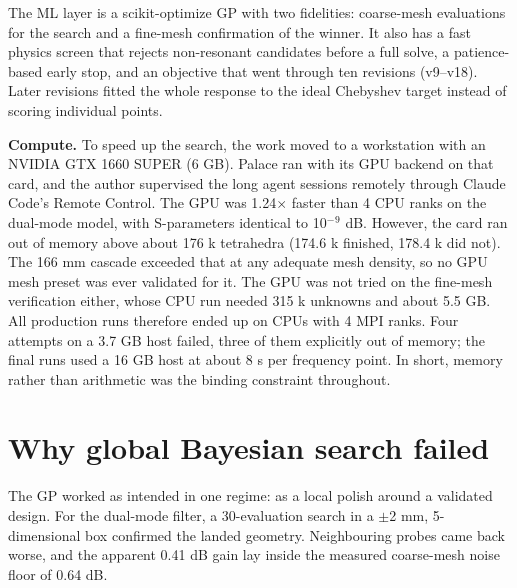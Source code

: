 \documentclass{ieeeaccess}
\begin{document}
The ML layer is a scikit-optimize GP \cite{skopt, rasmussen2006gaussian} with
two fidelities: coarse-mesh evaluations for the search and a fine-mesh
confirmation of the winner. It also has a fast physics screen that rejects
non-resonant candidates before a full solve, a patience-based early stop, and
an objective that went through ten revisions (v9--v18). Later revisions fitted
the whole response to the ideal Chebyshev target instead of scoring
individual points.

\textbf{Compute.} To speed up the search, the work moved to a workstation with an
NVIDIA GTX 1660 SUPER (6 GB). Palace ran with its GPU backend on that card,
and the author supervised the long agent sessions remotely through Claude
Code's Remote Control. The GPU was 1.24\ensuremath{\times} faster than 4 CPU ranks on the
dual-mode model, with S-parameters identical to 10\ensuremath{^{-}}\ensuremath{^{9}} dB. However, the card
ran out of memory above about 176 k tetrahedra (174.6 k finished, 178.4 k did
not). The 166 mm cascade exceeded that at any adequate mesh density, so no
GPU mesh preset was ever validated for it. The GPU was not tried on the
fine-mesh verification either, whose CPU run needed 315 k unknowns and about
5.5 GB. All production runs therefore ended up on CPUs with 4 MPI ranks. Four
attempts on a 3.7 GB host failed, three of them explicitly out of memory; the
final runs used a 16 GB host at about 8 s per frequency point. In short,
memory rather than arithmetic was the binding constraint throughout.

\hypertarget{why-global-bayesian-search-failed}{%
\section{Why global Bayesian search failed}\label{why-global-bayesian-search-failed}}

The GP worked as intended in one regime: as a local polish around a validated
design. For the dual-mode filter, a 30-evaluation search in a \ensuremath{\pm}2 mm,
5-dimensional box confirmed the landed geometry. Neighbouring probes came back
worse, and the apparent 0.41 dB gain lay inside the measured coarse-mesh noise
floor of 0.64 dB.
\end{document}
